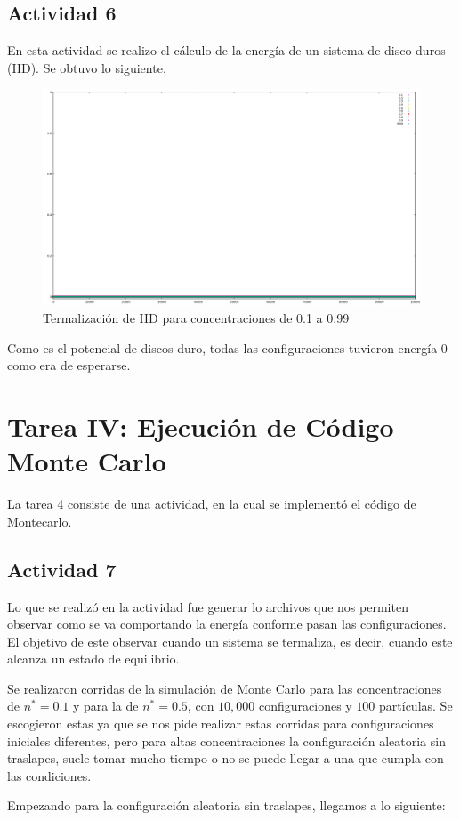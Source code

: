 \documentclass[12pt,letterpaper]{article}
\begin{document}
	\subsection*{Actividad 6}
	En esta actividad se realizo el cálculo de la energía de un sistema de disco duros (HD). Se obtuvo lo siguiente.
	\begin{figure}[H]
		\centering
		\includegraphics[width = 0.75\linewidth]{Terma.png}
		\caption{Termalización de HD para concentraciones de 0.1 a 0.99}
	\end{figure}
	Como es el potencial de discos duro, todas las configuraciones tuvieron energía 0 como era de esperarse.
\pagebreak
\section*{Tarea IV: Ejecución de Código Monte Carlo }
La tarea 4 consiste de una actividad, en la cual se implementó el código de Montecarlo.
\subsection*{Actividad 7}
Lo que se realizó en la actividad fue generar lo archivos que nos permiten observar como se va comportando la energía conforme pasan las configuraciones. El objetivo de este observar cuando un sistema se termaliza, es decir, cuando este alcanza un estado de equilibrio.

Se realizaron corridas de la simulación de Monte Carlo para las concentraciones de $n^* = 0.1$ y para la de $n^* = 0.5$, con $10,000$ configuraciones y $100$ partículas. Se escogieron estas ya que se nos pide realizar estas corridas para configuraciones  iniciales diferentes, pero para altas concentraciones la configuración aleatoria sin traslapes, suele tomar mucho tiempo o no se puede llegar a una que cumpla con las condiciones.

Empezando para la configuración aleatoria sin traslapes, llegamos a lo siguiente:
\end{document}
